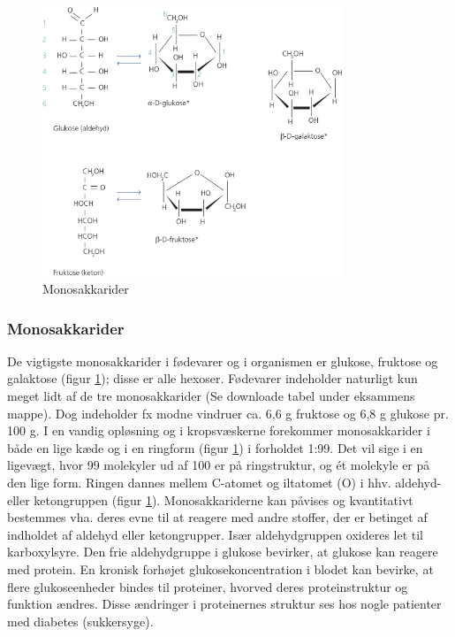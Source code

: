         \begin{figure}
            \centering
            \includegraphics[width=0.8\textwidth]{figurs/monosakarid.png}
            \caption{Monosakkarider}
            \label{fig:monosakkarider}
        \end{figure}
        \subsubsection*{Monosakkarider}
            De vigtigste monosakkarider i fødevarer og i organismen er glukose, fruktose og galaktose (figur \ref{fig:monosakkarider}); disse er alle hexoser. Fødevarer indeholder naturligt kun meget lidt af de tre monosakkarider (Se downloade tabel under eksammens mappe). Dog indeholder fx modne vindruer ca. 6,6 g fruktose og 6,8 g glukose pr. 100 g.
            I en vandig opløsning og i kropsvæskerne forekommer monosakkarider i både en lige kæde og i en ringform (figur \ref{fig:monosakkarider}) i forholdet 1:99. Det vil sige i en ligevægt, hvor 99 molekyler ud af 100 er på ringstruktur, og ét molekyle er på den lige form. Ringen dannes mellem C-atomet og iltatomet (O) i hhv. aldehyd- eller ketongruppen (figur \ref{fig:monosakkarider}). Monosakkariderne kan påvises og kvantitativt bestemmes vha. deres evne til at reagere med andre stoffer, der er betinget af indholdet af aldehyd eller ketongrupper. Især aldehydgruppen oxideres let til karboxylsyre. Den frie aldehydgruppe i glukose bevirker, at glukose kan reagere med protein. En kronisk forhøjet glukosekoncentration i blodet kan bevirke, at flere glukoseenheder bindes til proteiner, hvorved deres proteinstruktur og funktion ændres. Disse ændringer i proteinernes struktur ses hos nogle patienter med diabetes (sukkersyge).

